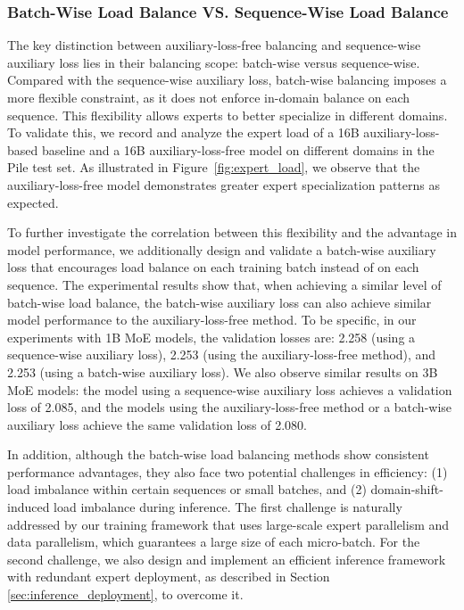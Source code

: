 \documentclass[11pt, a4paper, logo, copyright, nonumbering]{deepseek}
\begin{document}
\begin{CJK*}{UTF8}{gbsn}
\subsubsection{Batch-Wise Load Balance VS. Sequence-Wise Load Balance}
\label{discussion:balance}

The key distinction between auxiliary-loss-free balancing and sequence-wise auxiliary loss lies in their balancing scope: batch-wise versus sequence-wise. 
Compared with the sequence-wise auxiliary loss, batch-wise balancing imposes a more flexible constraint, as it does not enforce in-domain balance on each sequence. 
This flexibility allows experts to better specialize in different domains. 
To validate this, we record and analyze the expert load of a 16B auxiliary-loss-based baseline and a 16B auxiliary-loss-free model on different domains in the Pile test set.
As illustrated in Figure~\ref{fig:expert_load}, we observe that the auxiliary-loss-free model demonstrates greater expert specialization patterns as expected. 

To further investigate the correlation between this flexibility and the advantage in model performance, we additionally design and validate a batch-wise auxiliary loss that encourages load balance on each training batch instead of on each sequence. 
The experimental results show that, when achieving a similar level of batch-wise load balance, the batch-wise auxiliary loss can also achieve similar model performance to the auxiliary-loss-free method.
To be specific, in our experiments with 1B MoE models, the validation losses are: 2.258 (using a sequence-wise auxiliary loss), 2.253 (using the auxiliary-loss-free method), and 2.253 (using a batch-wise auxiliary loss). 
We also observe similar results on 3B MoE models: the model using a sequence-wise auxiliary loss achieves a validation loss of 2.085, and the models using the auxiliary-loss-free method or a batch-wise auxiliary loss achieve the same validation loss of 2.080.

In addition, although the batch-wise load balancing methods show consistent performance advantages, they also face two potential challenges in efficiency: 
(1) load imbalance within certain sequences or small batches, and 
(2) domain-shift-induced load imbalance during inference. 
The first challenge is naturally addressed by our training framework that uses large-scale expert parallelism and data parallelism, which guarantees a large size of each micro-batch. 
For the second challenge, we also design and implement an efficient inference framework with redundant expert deployment, as described in Section \ref{sec:inference_deployment}, to overcome it.


\end{CJK*}
\end{document}
